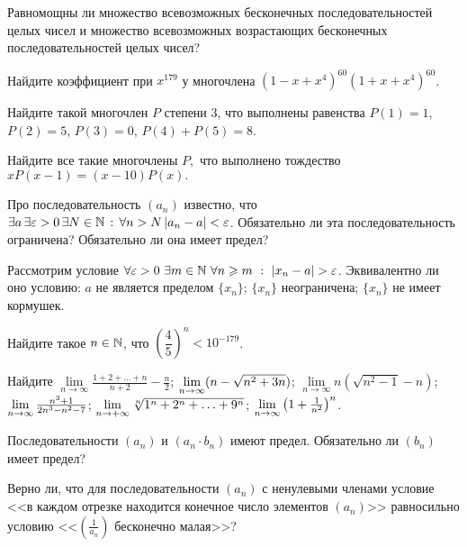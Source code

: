 \documentclass[a4paper,12pt]{article}
\begin{document}
Равномощны ли множество всевозможных бесконечных последовательностей
целых чисел и множество всевозможных возрастающих
бесконечных последовательностей целых чисел?

\newpage

Найдите коэффициент при $x^{179}$ у многочлена $(1-x+x^4)^{60}(1+x+x^4)^{60}$.

Найдите такой многочлен $P$ степени 3, что выполнены равенства $P(1)=1$, $P(2)=5$, $P(3)=0$, $P(4)+P(5)=8$.

Найдите все такие многочлены $P,$ что выполнено тождество $xP(x-1)=(x-10)P(x).$



Про последовательность $(a_n)$ известно, что
$\exists a\, \exists \varepsilon > 0 \, \exists N \in \mathbb{N} \, : \, \forall n > N \, |a_n - a| < \varepsilon$.
Обязательно ли эта последовательность ограничена? Обязательно ли она имеет предел?

Рассмотрим условие
$\forall \varepsilon >0 \ \exists m\in\N \
\forall n\ge m\ : \ |x_n-a|>\varepsilon$. Эквивалентно ли оно
условию:
 $a$ не является пределом $\{x_n\}$;
 $\{x_n\}$ неограничена;
\пункт $\{x_n\}$ не имеет кормушек.


 Найдите такое $n \in \mathbb{N}$, что $\left(\dfrac{4}{5}\right)^n < 10^{-179}$.
\кзадача

 Найдите  $\lim\limits_{n\to \infty} \frac{1+2+\ldots+n}{n+2} - \frac{n}{2}$;
 $\lim\limits_{n \rightarrow \infty}(n - \sqrt{n^2 + 3n})$;
\пункт $\lim\limits_{n\to \infty}n(\sqrt{n^2-1} - n)$;\\
 $\lim\limits_{n \rightarrow \infty} \frac{n^3 + 1}{2n^3 - n^2 - 7}$;
 $\lim\limits_{n\rightarrow+\infty}\root n \of{1^n+2^n+\ldots+9^n}$;
\пункт $\lim\limits_{n \rightarrow \infty}\left(1+\frac{1}{n^2}\right)^n$.



 Последовательности $(a_n)$ и $(a_n\cdot b_n)$ имеют предел. Обязательно ли $(b_n)$ имеет предел?
\кзадача




 Верно ли, что для последовательности $(a_n)$ с ненулевыми членами условие <<в каждом отрезке находится конечное число элементов $(a_n)$>>
равносильно условию <<$(\frac{1}{a_n})$ бесконечно малая>>?
\end{document}
